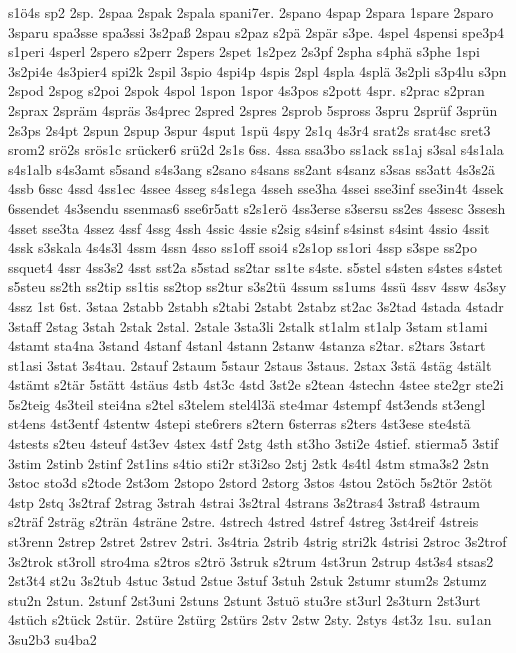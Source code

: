 {s1ö4s
sp2
2sp.
2spaa
2spak
2spala
spani7er.
2spano
4spap
2spara
1spare
2sparo
3sparu
spa3sse
spa3ssi
3s2paß
2spau
s2paz
s2pä
2spär
s3pe.
4spel
4spensi
spe3p4
s1peri
4sperl
2spero
s2perr
2spers
2spet
1s2pez
2s3pf
2spha
s4phä
s3phe
1spi
3s2pi4e
4s3pier4
spi2k
2spil
3spio
4spi4p
4spis
2spl
4spla
4splä
3s2pli
s3p4lu
s3pn
2spod
2spog
s2poi
2spok
4spol
1spon
1spor
4s3pos
s2pott
4spr.
s2prac
s2pran
2sprax
2spräm
4spräs
3s4prec
2spred
2spres
2sprob
5spross
3spru
2sprüf
3sprün
2s3ps
2s4pt
2spun
2spup
3spur
4sput
1spü
4spy
2s1q
4s3r4
srat2s
srat4sc
sret3
srom2
srö2s
srös1c
srücker6
srü2d
2s1s
6ss.
4ssa
ssa3bo
ss1ack
ss1aj
s3sal
s4s1ala
s4s1alb
s4s3amt
s5sand
s4s3ang
s2sano
s4sans
ss2ant
s4sanz
s3sas
ss3att
4s3s2ä
4ssb
6ssc
4ssd
4ss1ec
4ssee
4sseg
s4s1ega
4sseh
sse3ha
4ssei
sse3inf
sse3in4t
4ssek
6ssendet
4s3sendu
ssenmas6
sse6r5att
s2s1erö
4ss3erse
s3sersu
ss2es
4ssesc
3ssesh
4sset
sse3ta
4ssez
4ssf
4ssg
4ssh
4ssic
4ssie
s2sig
s4sinf
s4sinst
s4sint
4ssio
4ssit
4ssk
s3skala
4s4s3l
4ssm
4ssn
4sso
ss1off
ssoi4
s2s1op
ss1ori
4ssp
s3spe
ss2po
ssquet4
4ssr
4ss3s2
4sst
sst2a
s5stad
ss2tar
ss1te
s4ste.
s5stel
s4sten
s4stes
s4stet
s5steu
ss2th
ss2tip
ss1tis
ss2top
ss2tur
s3s2tü
4ssum
ss1ums
4ssü
4ssv
4ssw
4s3sy
4ssz
1st
6st.
3staa
2stabb
2stabh
s2tabi
2stabt
2stabz
st2ac
3s2tad
4stada
4stadr
3staff
2stag
3stah
2stak
2stal.
2stale
3sta3li
2stalk
st1alm
st1alp
3stam
st1ami
4stamt
sta4na
3stand
4stanf
4stanl
4stann
2stanw
4stanza
s2tar.
s2tars
3start
st1asi
3stat
3s4tau.
2stauf
2staum
5staur
2staus
3staus.
2stax
3stä
4stäg
4stält
4stämt
s2tär
5stätt
4stäus
4stb
4st3c
4std
3st2e
s2tean
4stechn
4stee
ste2gr
ste2i
5s2teig
4s3teil
stei4na
s2tel
s3telem
stel4l3ä
ste4mar
4stempf
4st3ends
st3engl
st4ens
4st3entf
4stentw
4stepi
ste6rers
s2tern
6sterras
s2ters
4st3ese
ste4stä
4stests
s2teu
4steuf
4st3ev
4stex
4stf
2stg
4sth
st3ho
3sti2e
4stief.
stierma5
3stif
3stim
2stinb
2stinf
2st1ins
s4tio
sti2r
st3i2so
2stj
2stk
4s4tl
4stm
stma3s2
2stn
3stoc
sto3d
s2tode
2st3om
2stopo
2stord
2storg
3stos
4stou
2stöch
5s2tör
2stöt
4stp
2stq
3s2traf
2strag
3strah
4strai
3s2tral
4strans
3s2tras4
3straß
4straum
s2träf
2sträg
s2trän
4sträne
2stre.
4strech
4stred
4stref
4streg
3st4reif
4streis
st3renn
2strep
2stret
2strev
2stri.
3s4tria
2strib
4strig
stri2k
4strisi
2stroc
3s2trof
3s2trok
st3roll
stro4ma
s2tros
s2trö
3struk
s2trum
4st3run
2strup
4st3s4
stsas2
2st3t4
st2u
3s2tub
4stuc
3stud
2stue
3stuf
3stuh
2stuk
2stumr
stum2s
2stumz
stu2n
2stun.
2stunf
2st3uni
2stuns
2stunt
3stuö
stu3re
st3url
2s3turn
2st3urt
4stüch
s2tück
2stür.
2stüre
2stürg
2stürs
2stv
2stw
2sty.
2stys
4st3z
1su.
su1an
3su2b3
su4ba2
}
